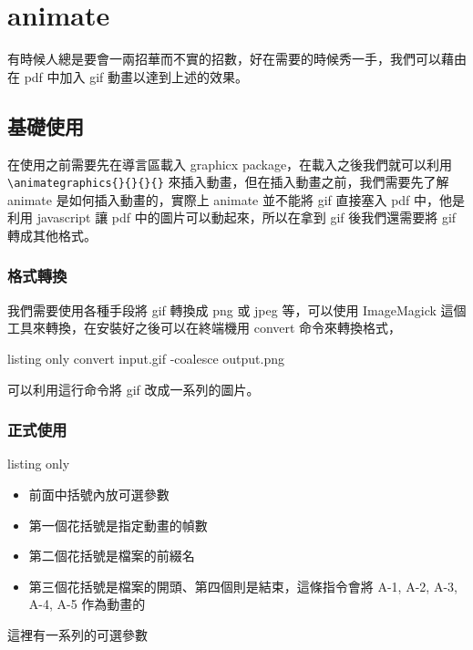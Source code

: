 \chapter{animate}

有時候人總是要會一兩招華而不實的招數，好在需要的時候秀一手，我們可以藉由在 pdf 中加入 gif 動畫以達到上述的效果。

\section{基礎使用}

在使用之前需要先在導言區載入 graphicx package，在載入之後我們就可以利用  \verb`\animategraphics{}{}{}{}` 來插入動畫，但在插入動畫之前，我們需要先了解 animate 是如何插入動畫的，實際上 animate 並不能將 gif 直接塞入 pdf 中，他是利用 javascript 讓 pdf 中的圖片可以動起來，所以在拿到 gif 後我們還需要將 gif 轉成其他格式。

\subsection{格式轉換}

我們需要使用各種手段將 gif 轉換成 png 或 jpeg 等，可以使用 ImageMagick 這個工具來轉換，在安裝好之後可以在終端機用 convert 命令來轉換格式，

\begin{tcblisting}{listing only}
convert input.gif -coalesce output.png
\end{tcblisting}

可以利用這行命令將 gif 改成一系列的圖片。

\subsection{正式使用}

\begin{tcblisting}{listing only}
\end{tcblisting}

\begin{itemize}
\item 前面中括號內放可選參數
\item 第一個花括號是指定動畫的幀數
\item 第二個花括號是檔案的前綴名
\item 第三個花括號是檔案的開頭、第四個則是結束，這條指令會將 A-1, A-2, A-3, A-4, A-5 作為動畫的
\end{itemize}

這裡有一系列的可選參數


